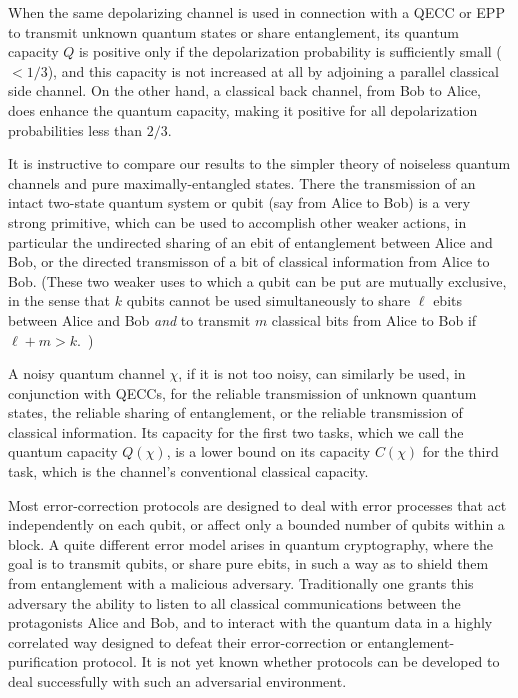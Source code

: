 When the same depolarizing channel is used in connection with a QECC or
EPP to transmit unknown quantum states or share entanglement, its
quantum capacity $Q$ is positive only if the depolarization
probability is sufficiently small ($<1/3$), and this capacity is not
increased at all by adjoining a parallel classical side channel. On the
other hand, a classical back channel, from Bob to Alice, does enhance
the quantum capacity, making it positive for all depolarization
probabilities less than $2/3$.

It is instructive to compare our results to the simpler theory of
noiseless quantum channels and pure maximally-entangled
states.  There
the transmission of an intact two-state quantum system or qubit (say
from Alice to Bob) is a very strong primitive, which can be
used to accomplish other weaker actions, in particular the undirected
sharing of an ebit of entanglement between Alice and Bob, or the
directed transmisson of a bit of classical information from Alice to
Bob. (These two weaker uses to which a qubit can be put are mutually
exclusive, in the sense that $k$ qubits cannot be used simultaneously to
share $\ell$ ebits between Alice and Bob {\em and\/} to transmit $m$
classical bits from Alice to Bob if \mbox{$\ell+m>k$}.~\cite{exclusive})

A noisy quantum channel $\chi$, if it is not too noisy, can similarly be
used, in conjunction with QECCs, for the reliable transmission of
unknown quantum states, the reliable sharing of entanglement, or the
reliable transmission of classical information.  Its capacity for the
first two tasks, which we call the quantum capacity $Q(\chi)$, is a
lower bound on its capacity $C(\chi)$ for the third task, which is the
channel's conventional classical capacity.
 
Most error-correction protocols are designed to deal with error
processes that act independently on each qubit, or affect only a bounded
number of qubits within a block. 
A quite different error model arises in quantum cryptography, where the
goal is to transmit qubits, or share pure ebits, in such a way as to
shield them from entanglement with a malicious adversary.  Traditionally
one grants this adversary the ability to listen to all classical
communications between the protagonists Alice and Bob, and to interact
with the quantum data in a highly correlated way designed to defeat
their error-correction or entanglement-purification protocol.
It is not yet known whether protocols can be developed to deal
successfully with such an adversarial environment.
 
